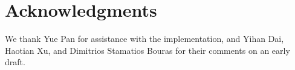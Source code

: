 \documentclass[sigconf,nonacm]{acmart}
\begin{document}


\section*{Acknowledgments}

We thank Yue Pan for assistance with the implementation, and Yihan Dai, Haotian Xu, and Dimitrios Stamatios Bouras for their comments on an early draft.



\end{document}
